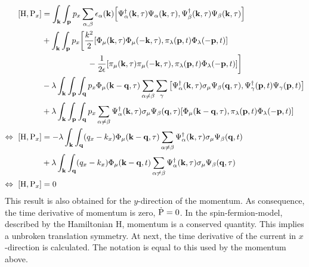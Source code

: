 \begin{align}
	\comm{\mt{H}}{\mt{P}_{x}} &= 
		\int_{\vb{k}} \int_{\vb{p}}
		p_{x}
		\sum\limits_{\alpha,\beta} 
		\epsilon_{\alpha}(\vb{k})
		\comm{\Psi_{\alpha}^{\dag}(\vb{k},\tau) \Psi_{\alpha}(\vb{k},\tau)}{\Psi_{\beta}^{\dag}(\vb{k},\tau) \Psi_{\beta}(\vb{k},\tau)}
		\notag \\&
		+
		\int_{\vb{k}} \int_{\vb{p}}
		p_{x}
		\bigg[
			\frac{k^{2}}{2}
			\comm{\Phi_{\mu}(\vb{k},\tau) \Phi_{\mu}(-\vb{k},\tau)}{\pi_{\lambda}(\vb{p},t) \Phi_{\lambda}(-\vb{p},t)}
			\notag \\& \hspace{2cm}
			-
			\frac{1}{2\epsilon}
			\comm{\pi_{\mu}(\vb{k},\tau) \pi_{\mu}(-\vb{k},\tau)}{\pi_{\lambda}(\vb{p},t) \Phi_{\lambda}(-\vb{p},t)}
		\bigg]
		\notag \\&
		-
		\lambda
		\int_{\vb{k}} \int_{\vb{p}} \int_{\vb{q}}
		p_{x}
		\Phi_{\mu}(\vb{k}-\vb{q},\tau)
		\sum\limits_{\alpha\neq\beta}
		\sum\limits_{\gamma}
		\comm{\Psi_{\alpha}^{\dag}(\vb{k},\tau) \sigma_{\mu} \Psi_{\beta}(\vb{q},\tau)}{\Psi_{\gamma}^{\dag}(\vb{p},t) \Psi_{\gamma}(\vb{p},t)}
		\notag \\&
		+
		\lambda
		\int_{\vb{k}} \int_{\vb{p}} \int_{\vb{q}}
		p_{x}
		\sum\limits_{\alpha\neq\beta}
		\Psi_{\alpha}^{\dag}(\vb{k},\tau) \sigma_{\mu} \Psi_{\beta}(\vb{q},\tau)
		\comm{\Phi_{\mu}(\vb{k}-\vb{q},\tau)}{\pi_{\lambda}(\vb{p},t) \Phi_{\lambda}(-\vb{p},t)}
	\notag \\
	\Leftrightarrow\ \comm{\mt{H}}{\mt{P}_{x}} &=	
		-
		\lambda
		\int_{\vb{k}} \int_{\vb{q}}
		(q_{x}-k_{x})
		\Phi_{\mu}(\vb{k}-\vb{q},\tau)
		\sum\limits_{\alpha\neq\beta}
		\Psi_{\alpha}^{\dag}(\vb{k},\tau) \sigma_{\mu} \Psi_{\beta}(\vb{q},t)
		\notag \\&
		+
		\lambda
		\int_{\vb{k}} \int_{\vb{q}}
		(q_{x}-k_{x})
		\Phi_{\mu}(\vb{k}-\vb{q},t)
		\sum\limits_{\alpha\neq\beta}
		\Psi_{\alpha}^{\dag}(\vb{k},\tau) \sigma_{\mu} \Psi_{\beta}(\vb{q},\tau)
	\notag \\
	\Leftrightarrow\ \comm{\mt{H}}{\mt{P}_{x}} &= 0
\end{align}
%
This result is also obtained for the $y$-direction of the momentum.
As consequence, the time derivative of momentum is zero, $\dot{\mathrm{P}} = 0$.
In the spin-fermion-model, described by the Hamiltonian H, momentum is a conserved quantity.
This implies a unbroken translation symmetry.
At next, the time derivative of the current in $x$-direction is calculated.
The notation is equal to this used by the momentum above.
%
